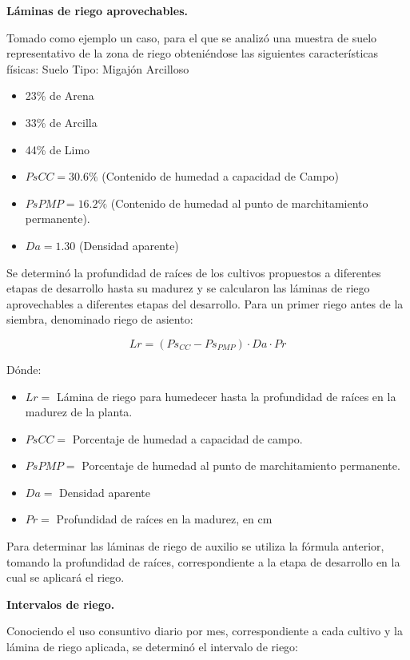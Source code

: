 \textbf{Láminas de riego aprovechables.}

Tomado como ejemplo un caso, para el que se analizó una muestra de suelo
representativo de la zona de riego obteniéndose las siguientes características físicas:
Suelo Tipo: Migajón Arcilloso

\begin{itemize}
	\item 23\% de Arena
	\item 33\% de Arcilla
	\item 44\% de Limo
	\item $PsCC = 30.6\%$ (Contenido de humedad a capacidad de Campo)
	\item $PsPMP =16.2\%$ (Contenido de humedad al punto de marchitamiento permanente).
	\item $Da = 1.30$ (Densidad aparente)
\end{itemize}

Se determinó la profundidad de raíces de los cultivos propuestos a diferentes
etapas de desarrollo hasta su madurez y se calcularon las láminas de riego
aprovechables a diferentes etapas del desarrollo.
Para un primer riego antes de la siembra, denominado riego de asiento:

\begin{equation}
	Lr = \left(Ps_{CC} - Ps_{PMP}\right) \cdot Da \cdot Pr
\end{equation}

Dónde:
\begin{itemize}
	\item $Lr =$ Lámina de riego para humedecer hasta la profundidad de raíces en la madurez de la planta.
	\item $PsCC =$ Porcentaje de humedad a capacidad de campo.
	\item $PsPMP =$ Porcentaje de humedad al punto de marchitamiento permanente.
	\item $Da =$ Densidad aparente
	\item $Pr =$ Profundidad de raíces en la madurez, en cm
\end{itemize}


Para determinar las láminas de riego de auxilio se utiliza la fórmula anterior,
tomando la profundidad de raíces, correspondiente a la etapa de desarrollo en la cual
se aplicará el riego.

\textbf{Intervalos de riego.}

Conociendo el uso consuntivo diario por mes, correspondiente a cada cultivo y la
lámina de riego aplicada, se determinó el intervalo de riego:

